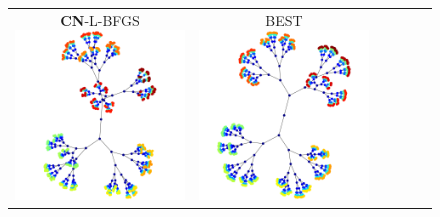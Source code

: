 \documentclass[dvipdfmx,10pt,journal,compsoc]{IEEEtran}
\begin{document}
\begin{figure}[btp]
\begin{tabular}{cccccc}
    \makecell{\small{\textsf{\textbf{CN}-L-BFGS}}                                                                                                        \\[-0.2em]\includegraphics[width=0.27\columnwidth]{individual/vis/btree9_CN-L-BFGS.png}} &
    \makecell{\small{\textsf{BEST}}                                                                                                                      \\[-0.2em]\includegraphics[width=0.27\columnwidth]{individual/vis/opt_btree9.png}} \\


\end{tabular}
\end{figure}
\end{document}

